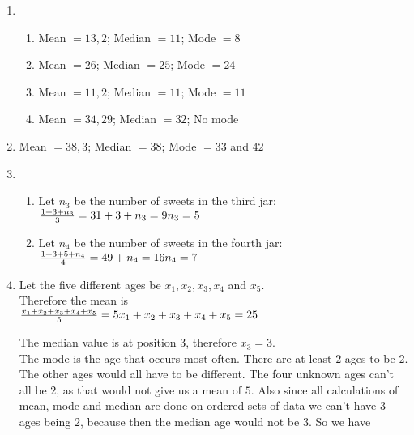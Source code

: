  \begin{solutions}{}{
\begin{enumerate}[itemsep=5pt, label=\textbf{\arabic*}. ] 


\item %
      \begin{enumerate}[noitemsep, label=\textbf{(\alph*)} ]
\item Mean $= 13,2$; Median $= 11$; Mode $= 8$ %
\item Mean $= 26$; Median $= 25$; Mode $= 24$%
\item Mean $=11,2$; Median $= 11$; Mode $=11$%
\item Mean $=34,29$; Median $=32$; No mode%
    \end{enumerate}
\item %
Mean $=38,3$; Median $= 38$; Mode $= 33$ and $42$\\
\item %
       \begin{enumerate}[noitemsep, label=\textbf{(\alph*)} ]
\item Let $n_3$ be the number of sweets in the third jar:\\
$\frac{1+3+n_3}{3}=3\\
1+3+n_3=9\\
n_3=5$\\

\item Let $n_4$ be the number of sweets in the fourth jar:\\
$\frac{1+3+5+n_4}4=4\\
9+n_4=16\\
n_4=7\\$\\
    \end{enumerate}

\item %
Let the five different ages be $x_1,x_2,x_3,x_4$ and $x_5$.\\
Therefore the mean is\\

$\frac{x_1+x_2+x_3+x_4+x_5}{5}=5\\
x_1+x_2+x_3+x_4+x_5=25\\$
 
The median value is at position $3$, therefore $x_3=3$.\\

The mode is the age that occurs most often. There are at least $2$ ages to be $2$. The other ages would all have to be different. The four unknown ages can't all be $2$, as that would not give us a mean of $5$. Also since all calculations of mean, mode and median are done on ordered sets of data we can't have $3$ ages being $2$, because then the median age would not be $3$. So we have \\


\end{enumerate}}
\end{solutions}
